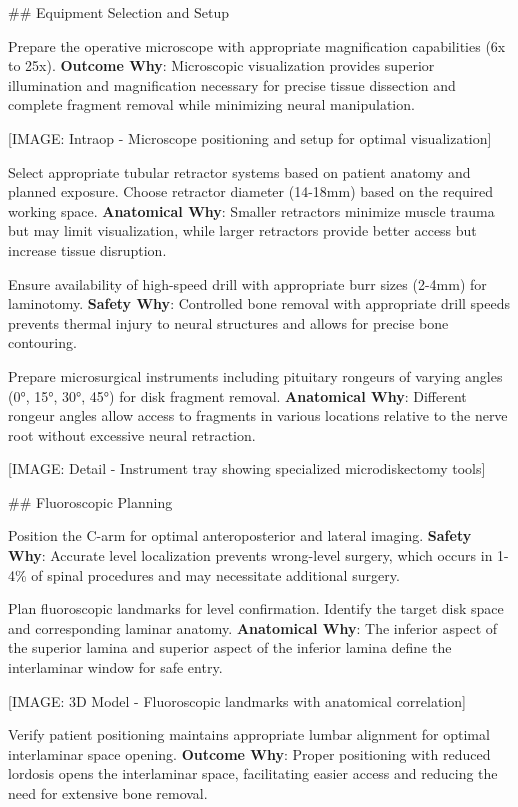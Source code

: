 \documentclass[12pt,a4paper]{article}
\begin{document}
\#\# Equipment Selection and Setup

Prepare the operative microscope with appropriate magnification capabilities (6x to 25x). \textbf{Outcome Why}: Microscopic visualization provides superior illumination and magnification necessary for precise tissue dissection and complete fragment removal while minimizing neural manipulation.

[IMAGE: Intraop - Microscope positioning and setup for optimal visualization]

Select appropriate tubular retractor systems based on patient anatomy and planned exposure. Choose retractor diameter (14-18mm) based on the required working space. \textbf{Anatomical Why}: Smaller retractors minimize muscle trauma but may limit visualization, while larger retractors provide better access but increase tissue disruption.

Ensure availability of high-speed drill with appropriate burr sizes (2-4mm) for laminotomy. \textbf{Safety Why}: Controlled bone removal with appropriate drill speeds prevents thermal injury to neural structures and allows for precise bone contouring.

Prepare microsurgical instruments including pituitary rongeurs of varying angles (0°, 15°, 30°, 45°) for disk fragment removal. \textbf{Anatomical Why}: Different rongeur angles allow access to fragments in various locations relative to the nerve root without excessive neural retraction.

[IMAGE: Detail - Instrument tray showing specialized microdiskectomy tools]

\#\# Fluoroscopic Planning

Position the C-arm for optimal anteroposterior and lateral imaging. \textbf{Safety Why}: Accurate level localization prevents wrong-level surgery, which occurs in 1-4\% of spinal procedures and may necessitate additional surgery.

Plan fluoroscopic landmarks for level confirmation. Identify the target disk space and corresponding laminar anatomy. \textbf{Anatomical Why}: The inferior aspect of the superior lamina and superior aspect of the inferior lamina define the interlaminar window for safe entry.

[IMAGE: 3D Model - Fluoroscopic landmarks with anatomical correlation]

Verify patient positioning maintains appropriate lumbar alignment for optimal interlaminar space opening. \textbf{Outcome Why}: Proper positioning with reduced lordosis opens the interlaminar space, facilitating easier access and reducing the need for extensive bone removal.
\end{document}
